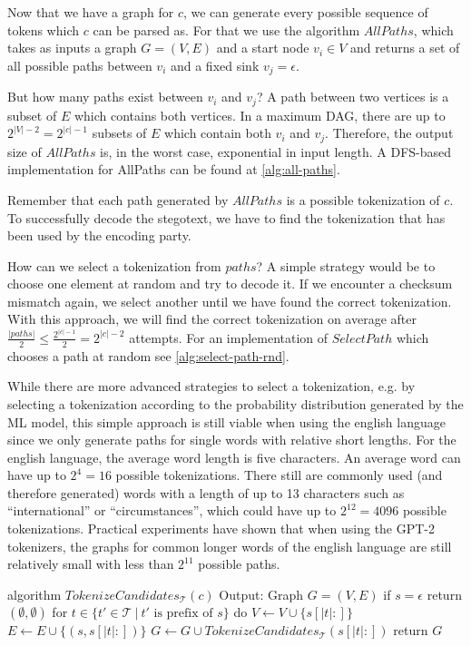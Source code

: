Now that we have a graph for $c$, we can generate every possible sequence of tokens which $c$ can be parsed as.
For that we use the algorithm $AllPaths$, which takes as inputs a graph $G = (V, E)$ and a start node $v_i \in V$ and returns a set of all possible paths between $v_i$ and a fixed sink $v_j = \epsilon$.

But how many paths exist between $v_i$ and $v_j$?
A path between two vertices is a subset of $E$ which contains both vertices.
In a maximum DAG, there are up to $2^{|V|-2} = 2^{|c|-1}$ subsets of $E$ which contain both $v_i$ and $v_j$.
Therefore, the output size of $AllPaths$ is, in the worst case, exponential in input length.
A DFS-based implementation for AllPaths can be found at \autoref{alg:all-paths}.

Remember that each path generated by $AllPaths$ is a possible tokenization of $c$.
To successfully decode the stegotext, we have to find the tokenization that has been used by the encoding party.

How can we select a tokenization from $paths$?
A simple strategy would be to choose one element at random and try to decode it.
If we encounter a checksum mismatch again, we select another until we have found the correct tokenization.
With this approach, we will find the correct tokenization on average after $\frac{|paths|}{2} \leq \frac{2^{|c|-1}}{2} = 2^{|c|-2}$ attempts.
For an implementation of $SelectPath$ which chooses a path at random see \autoref{alg:select-path-rnd}.

While there are more advanced strategies to select a tokenization, e.g. by selecting a tokenization according to the probability distribution generated by the ML model, this simple approach is still viable when using the english language since we only generate paths for single words with relative short lengths.
 For the english language, the average word length is five characters.
An average word can have up to $2^4 = 16$ possible tokenizations.
There still are commonly used (and therefore generated) words with a length of up to 13 characters such as ``international'' or ``circumstances'', which could have up to $2^{12} = 4096$ possible tokenizations.
Practical experiments have shown that when using the GPT-2 tokenizers, the graphs for common longer words of the english language are still relatively small with less than $2^{11}$ possible paths.



\begin{Pseudocode}[float,caption={
TokenizeCandidates Algorithm.
This generates a graph $G = (V, E)$ from a string $c$.
Vertices are substrings of $c$, each edge represents a token to use to transform between substrings.
}, label={alg:tokenize-candidates}]
algorithm $TokenizeCandidates_{\mathcal{T}}(c)$
	Output: Graph $G = (V, E)$
	if $s = \epsilon$
		return $(\emptyset, \emptyset)$
	for $t \in \{ t' \in \mathcal{T}~ |~ t' \textrm{ is prefix of } s \}$ do
		$V \leftarrow V \cup \{ s[|t|{:}] \}$
		$E \leftarrow E \cup \{ (s, s[|t|{:}]) \}$
		$G \leftarrow G \cup TokenizeCandidates_{\mathcal{T}}(s[|t|{:}])$
	return $G$
\end{Pseudocode}

